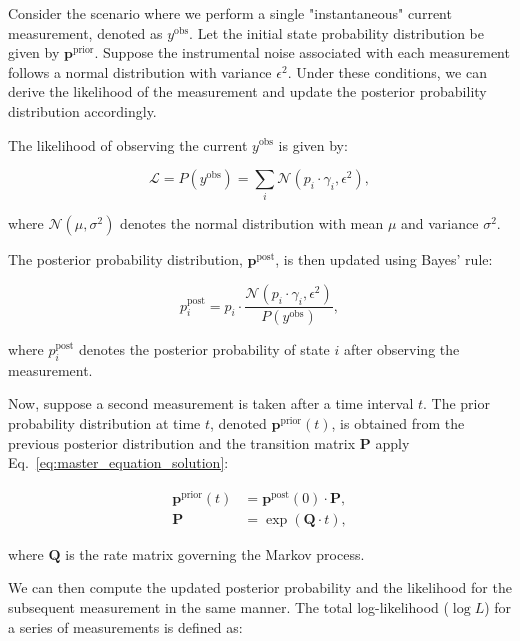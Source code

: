 \documentclass[pdflatex,sn-mathphys-num]{sn-jnl}%
\theoremstyle{thmstyleone}%
\theoremstyle{thmstyletwo}%
\theoremstyle{thmstylethree}%
\begin{document}
Consider the scenario where we perform a single "instantaneous" current measurement, denoted as \( y^{\text{obs}} \). Let the initial state probability distribution be given by \( \boldsymbol{p}^{\text{prior}} \). Suppose the instrumental noise associated with each measurement follows a normal distribution with variance \( \epsilon^2 \). Under these conditions, we can derive the likelihood of the measurement and update the posterior probability distribution accordingly.

The likelihood of observing the current \( y^{\text{obs}} \) is given by:

\begin{equation}
	\mathcal{L} = P(y^{\text{obs}}) = \sum_i \mathcal{N}(p_i \cdot \gamma_i, \epsilon^2),
	\label{eq:likelihood}
\end{equation}

where \( \mathcal{N}(\mu, \sigma^2) \) denotes the normal distribution with mean \( \mu \) and variance \( \sigma^2 \).

The posterior probability distribution, \( \boldsymbol{p}^{\text{post}} \), is then updated using Bayes' rule:

\begin{equation}
	p^{\text{post}}_i = p_i \cdot \frac{\mathcal{N}(p_i \cdot \gamma_i, \epsilon^2)}{P(y^{\text{obs}})},
	\label{eq:posterior}
\end{equation}

where \( p^{\text{post}}_i \) denotes the posterior probability of state \( i \) after observing the measurement.

Now, suppose a second measurement is taken after a time interval \( t \). The prior probability distribution at time \( t \), denoted \( \boldsymbol{p}^{\text{prior}}(t) \), is obtained from the previous posterior distribution and the transition matrix \( \boldsymbol{P} \) apply Eq.~\ref{eq:master_equation_solution}:

\begin{align}
	\boldsymbol{p}^{\text{prior}}(t) &= \boldsymbol{p}^{\text{post}}(0) \cdot \boldsymbol{P}, \nonumber \\
	\boldsymbol{P} &= \exp(\boldsymbol{Q} \cdot t),
	\label{eq:prior_update}
\end{align}

where \( \boldsymbol{Q} \) is the rate matrix governing the Markov process.

We can then compute the updated posterior probability and the likelihood for the subsequent measurement in the same manner. The total log-likelihood (\( \log L \)) for a series of measurements is defined as:
\end{document}
